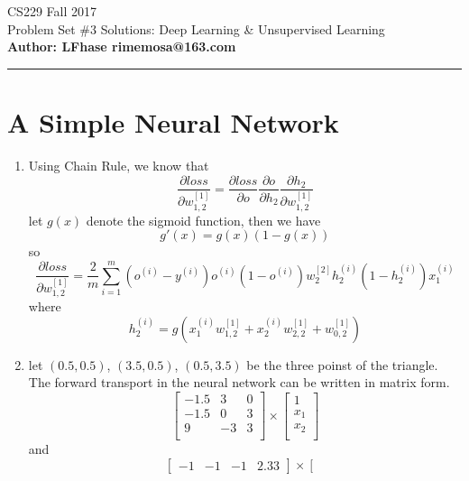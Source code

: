 \documentclass[12pt]{article}
\begin{document}
    \begin{flushleft}
    \LARGE CS229 Fall 2017\\
    \LARGE Problem Set \#3 Solutions:  Deep Learning \& Unsupervised Learning \\
    \textbf{\normalsize Author: LFhase \quad rimemosa@163.com}
    \end{flushleft} 
    \noindent
    \rule{\linewidth}{0.4pt}

    \section*{A Simple Neural Network}
    \begin{enumerate}[label=(\alph*)]
        \item Using Chain Rule, we know that 
        $$\frac{\partial loss}{\partial w_{1,2}^{[1]}}
        = \frac{\partial loss}{\partial o}\frac{\partial o}{\partial h_2}\frac{\partial h_2}{\partial w_{1,2}^{[1]}}$$
        let $g(x)$ denote the sigmoid function, then we have
        $$g'(x) = g(x)(1-g(x))$$
        so $$\frac{\partial loss}{\partial w_{1,2}^{[1]}}
        =\frac{2}{m}\sum_{i=1}^m (o^{(i)}-y^{(i)})o^{(i)}(1-o^{(i)})w_2^{[2]}h_2^{(i)}(1-h_2^{(i)})x^{(i)}_1$$
        where 
        $$h_2^{(i)}=g(x^{(i)}_1w_{1,2}^{[1]}+x^{(i)}_2w_{2,2}^{[1]}+w_{0,2}^{[1]})$$
        \item let $(0.5,0.5)$, $(3.5,0.5)$, $(0.5,3.5)$ be the three poinst of the triangle.
        The forward transport in the neural network can be written in matrix form.
        $$
        \left[\begin{matrix}
            -1.5 & 3 & 0 \\
            -1.5 & 0 & 3 \\
            9 & -3 & 3\\
        \end{matrix}\right] 
        \times
        \left[\begin{matrix}
            1 \\
            x_1 \\
            x_2\\
        \end{matrix}\right]
        $$
        and
        $$
        \left[\begin{matrix}
            -1 & -1 & -1 & 2.33
        \end{matrix}\right] 
        \times
        \left[\begin{matrix}

\end{matrix}$$
\end{enumerate}
\end{document}

